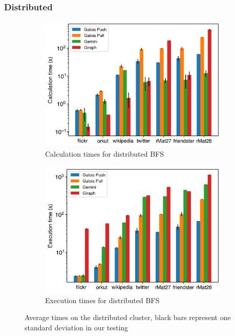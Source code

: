 \subsubsection{Distributed}
\begin{figure}
	\begin{subfigure}{\columnwidth}
		\includegraphics[width=\linewidth]{../../plots/distributedBFS_calcTime.png}
		\caption{Calculation times for distributed BFS}
		\label{fig:distributedBFS_calc}
	\end{subfigure}
	\begin{subfigure}{\columnwidth}
		\includegraphics[width=\linewidth]{../../plots/distributedBFS_execTime.png}
		\caption{Execution times for distributed BFS}
		\label{fig:distributedBFS_exec}
	\end{subfigure}
	\caption{Average times on the distributed cluster, black bars represent one standard deviation in our testing}
	\label{fig:distributedBFS}
\end{figure}

